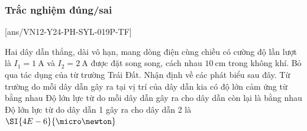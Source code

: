\subsubsection{Trắc nghiệm đúng/sai}
[ans/VN12-Y24-PH-SYL-019P-TF]
\setcounter{ex}{0}
\begin{ex}
	Hai dây dẫn thẳng, dài vô hạn, mang dòng điện cùng chiều có cường độ lần lượt là $I_1=\SI{1}{\ampere}$ và $I_2=\SI{2}{\ampere}$ được đặt song song, cách nhau $\SI{10}{\centi\meter}$ trong không khí. Bỏ qua tác dụng của từ trường Trái Đất. Nhận định về các phát biểu sau đây.
	{Từ trường do mỗi dây dẫn gây ra tại vị trí của dây dẫn kia có độ lớn cảm ứng từ bằng nhau}
	{\True Độ lớn lực từ do mỗi dây dẫn gây ra cho dây dẫn còn lại là bằng nhau}
	{\True Độ lớn lực từ do dây dẫn 1 gây ra cho dây dẫn 2 là $\SI{4E-6}{\micro\newton}$}
	\loigiai{}
\end{ex}


